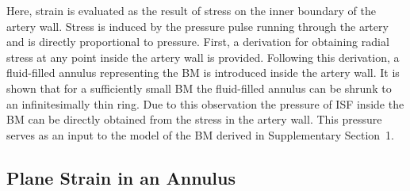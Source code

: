 \documentclass{frontiers_suppmat} %
\begin{document}
Here, strain is evaluated as the result of stress on the inner boundary of the artery wall. Stress is induced by the pressure pulse running through the artery and is directly proportional to pressure. First, a derivation for obtaining radial stress at any point inside the artery wall is provided. Following this derivation, a fluid-filled annulus representing the BM is introduced inside the artery wall. It is shown that for a sufficiently small BM the fluid-filled annulus can be shrunk to an infinitesimally thin ring. Due to this observation the pressure of ISF inside the BM can be directly obtained from the stress in the artery wall. This pressure serves as an input to the model of the BM derived in Supplementary Section~1.


\subsection{Plane Strain in an Annulus}
\label{sec:planestrain}
\end{document}
